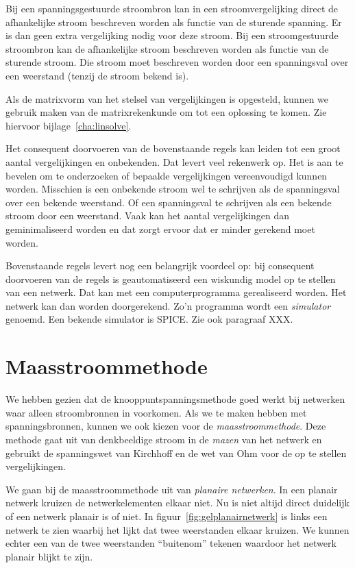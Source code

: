 Bij een spanningsgestuurde stroombron kan in een stroomvergelijking direct de afhankelijke stroom beschreven worden als functie van de sturende spanning. Er is dan geen extra vergelijking nodig voor deze stroom. Bij een stroomgestuurde stroombron kan de afhankelijke stroom beschreven worden als functie van de sturende stroom. Die stroom moet beschreven worden door een spanningsval over een weerstand (tenzij de stroom bekend is).

Als de matrixvorm van het stelsel van vergelijkingen is opgesteld, kunnen we gebruik maken van de matrixrekenkunde om tot een oplossing te komen. Zie hiervoor bijlage~\ref{cha:linsolve}.

Het consequent doorvoeren van de bovenstaande regels kan leiden tot een groot aantal vergelijkingen en onbekenden. Dat levert veel rekenwerk op. Het is aan te bevelen om te onderzoeken of bepaalde vergelijkingen vereenvoudigd kunnen worden. Misschien is een onbekende stroom wel te schrijven als de spanningsval over een bekende weerstand. Of een spanningsval te schrijven als een bekende stroom door een weerstand. Vaak kan het aantal vergelijkingen dan geminimaliseerd worden en dat zorgt ervoor dat er minder gerekend moet worden.

Bovenstaande regels levert nog een belangrijk voordeel op: bij consequent doorvoeren van de regels is geautomatiseerd een wiskundig model op te stellen van een netwerk. Dat kan met een computerprogramma gerealiseerd worden. Het netwerk kan dan worden doorgerekend. Zo'n programma wordt een \textsl{simulator} genoemd. Een bekende simulator is SPICE. Zie ook paragraaf XXX.

\fi
\ifmaasstroom

\section{Maasstroommethode}
We hebben gezien dat de knooppuntspanningsmethode goed werkt bij netwerken waar alleen stroombronnen in voorkomen. Als we te maken hebben met spanningsbronnen, kunnen we ook kiezen voor de \textsl{maasstroommethode}. Deze methode gaat uit van denkbeeldige stroom in de \textsl{mazen} van het netwerk en gebruikt de spanningswet van Kirchhoff en de wet van Ohm voor de op te stellen vergelijkingen.

We gaan bij de maasstroommethode uit van \textsl{planaire netwerken}. In een planair netwerk kruizen de netwerkelementen elkaar niet. Nu is niet altijd direct duidelijk of een netwerk planair is of niet. In figuur~\ref{fig:gelplanairnetwerk} is links een netwerk te zien waarbij het lijkt dat twee weerstanden elkaar kruizen. We kunnen echter een van de twee weerstanden ``buitenom'' tekenen waardoor het netwerk planair blijkt te zijn.

